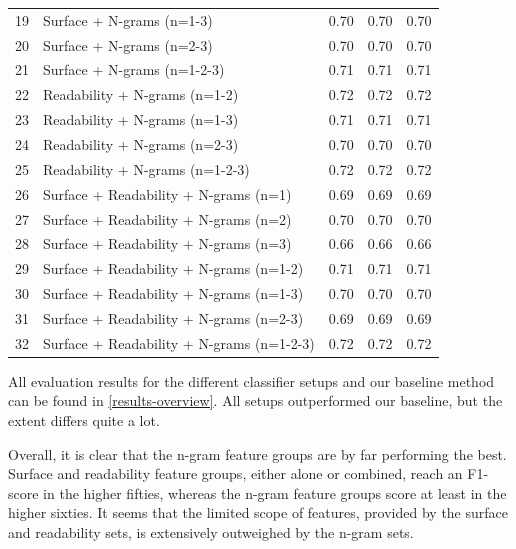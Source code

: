 \documentclass[
10pt, %
a4paper, %
oneside, %
headinclude,footinclude, %
] {book}%
\begin{document}
\begin{table}[]
\begin{tabular}{@{}lllll@{}}
19 & Surface + N-grams (n=1-3)                 & 0.70          & 0.70       & 0.70 \\
20 & Surface + N-grams (n=2-3)                 & 0.70          & 0.70       & 0.70 \\
21 & Surface + N-grams (n=1-2-3)               & 0.71          & 0.71       & 0.71 \\
22 & Readability + N-grams (n=1-2)             & 0.72          & 0.72       & 0.72 \\
23 & Readability + N-grams (n=1-3)             & 0.71          & 0.71       & 0.71 \\
24 & Readability + N-grams (n=2-3)             & 0.70          & 0.70       & 0.70 \\
25 & Readability + N-grams (n=1-2-3)           & 0.72          & 0.72       & 0.72 \\
26 & Surface + Readability + N-grams (n=1)     & 0.69          & 0.69       & 0.69 \\
27 & Surface + Readability + N-grams (n=2)     & 0.70          & 0.70       & 0.70 \\
28 & Surface + Readability + N-grams (n=3)     & 0.66          & 0.66       & 0.66 \\
29 & Surface + Readability + N-grams (n=1-2)   & 0.71          & 0.71       & 0.71 \\
30 & Surface + Readability + N-grams (n=1-3)   & 0.70          & 0.70       & 0.70 \\
31 & Surface + Readability + N-grams (n=2-3)   & 0.69          & 0.69       & 0.69 \\
32 & Surface + Readability + N-grams (n=1-2-3) & 0.72          & 0.72       & 0.72 \\ \bottomrule
\end{tabular}
\end{table}

All evaluation results for the different classifier setups and our baseline method can be found in \autoref{results-overview}. All setups outperformed our baseline, but the extent differs quite a lot. 

Overall, it is clear that the n-gram feature groups are by far performing the best. Surface and readability feature groups, either alone or combined, reach an F1-score in the higher fifties, whereas the n-gram feature groups score at least in the higher sixties. It seems that the limited scope of features, provided by the surface and readability sets, is extensively outweighed by the n-gram sets. 
\end{document}
